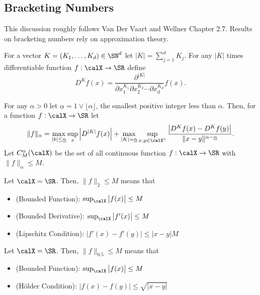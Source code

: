 
\subsection{Bracketing Numbers}%
\label{subsec:bracketing}

This discussion roughly follows Van Der Vaart and Wellner Chapter 2.7. Results on bracketing numbers rely on approximation theory.

\begin{definition}
	\label{def:differential}
	For a vector \(K = (K_1,\dots,K_d) \in \SN^d\) let \(|K| = \sum_{j=1}^d K_j\). For any \(|K|\) times differentiable function \(f:\calX\to\SR\) define
	\[
		D^Kf(x) = \frac{\partial^{|K|}}{\partial x_1^{K_1}\partial x_2^{K_2}\cdots\partial x_d^{K_d}} f(x)
	.\] 
\end{definition}
\begin{definition}
	\label{def:differntial-norm}
	For any \(\alpha > 0\) let \(\underline{\alpha} = 1 \vee \lfloor \alpha \rfloor\), the smallest positive integer less than \(\alpha\). Then, for a function \(f:\calX\to\SR\) let 
	\[
		\|f\|_\alpha = \max_{|k|\leq \underline{\alpha}}\sup_x \left|D^{|K|}f(x)\right|  + \max_{|K|=\underline{\alpha}}\sup_{x,y\in\calX^{\circ}} \frac{\left|D^Kf(x)-D^Kf(y)\right|}{\|x-y\|^{\alpha - \underline{\alpha}} }  
	.\]
	Let \(C_M^\alpha(\calX)\) be the set of all continuous function \(f:\calX\to\SR\) with \(\|f\|_\alpha \leq M\).
\end{definition}
\begin{example*}
	Let \(\calX=\SR\). Then, \(\|f\|_2 \leq  M\) means that
	\begin{itemize}
		\item (Bounded Function): \(\sup_\calX \left|f(x)\right| \leq  M\)
		\item (Bounded Derivative): \(\sup_\calX \left|f'(x)\right| \leq M\)
		\item (Lipschitz Condition): \(|f'(x)-f'(y)| \leq |x-y|M\)
	\end{itemize} 
\end{example*} 

\begin{example*}
	Let \(\calX=\SR\). Then, \(\|f\|_{0.5} \leq  M\) means that
	\begin{itemize}
		\item (Bounded Function): \(\sup_\calX \left|f(x)\right|\leq M\)
		\item (Hölder Condition): \(\left|f(x)-f(y)\right|\leq \sqrt{|x-y|} \)
	\end{itemize}
\end{example*}

